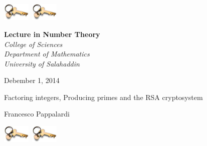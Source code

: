 \documentclass[landscape,handout]{powersem} %
\begin{document}
\begin{slide}
\addtocounter{slide}{-1}
\includegraphics[width=1.3cm]{images/crypto.jpg}\ \hfill \includegraphics[width=1.3cm]{images/crypto.jpg}
\vfil

\begin{sc}\begin{center}
\vfil
\small{
\textbf{Lecture in Number Theory}\\ \emph{
College of Sciences\\ Department of Mathematics\\ University of Salahaddin}}

Debember 1, 2014
\vspace*{1cm}

\begin{Large}
\textcolor{underlcolor}{Factoring integers, Producing primes and the RSA cryptosystem}
\end{Large}
\vfill
Francesco Pappalardi
\end{center}
\end{sc}

\vfill

\includegraphics[width=1.3cm]{images/crypto.jpg}\ \hfill \includegraphics[width=1.3cm]{images/crypto.jpg}
\end{slide}
\end{document}
